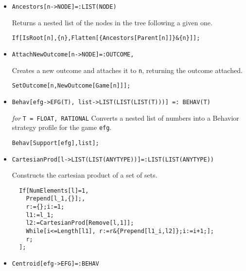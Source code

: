 \begin{itemize}
\item{}
\protect \large \begin{verbatim}
Ancestors[n->NODE]=:LIST(NODE)
\end{verbatim}\normalsize

\bd 
Returns a nested list of the nodes in the tree following a given one.  
\begin{verbatim}
If[IsRoot[n],{n},Flatten[{Ancestors[Parent[n]]}&{n}]];
\end{verbatim} 
\ed


\item{}
\protect \large \begin{verbatim}
AttachNewOutcome[n->NODE]=:OUTCOME,
\end{verbatim}\normalsize

\bd 
Creates a new outcome and attaches it to \verb+n+, returning the
outcome attached.  
\begin{verbatim}
SetOutcome[n,NewOutcome[Game[n]]];
\end{verbatim} 
\ed


\item{}
\protect \large \begin{verbatim}
Behav[efg->EFG(T), list->LIST(LIST(LIST(T)))] =: BEHAV(T)
\end{verbatim}\normalsize

{\it for} {\tt T = FLOAT, RATIONAL}
\bd 
Converts a nested list of numbers into a Behavior strategy
profile for the game \verb+efg+.
\begin{verbatim}
Behav[Support[efg],list];
\end{verbatim} 
\ed

\item{}
\protect \large \begin{verbatim}
CartesianProd[l->LIST(LIST(ANYTYPE))]=:LIST(LIST(ANYTYPE))
\end{verbatim}\normalsize

\bd 
Constructs the cartesian product of a set of sets.  
\begin{verbatim}
  If[NumElements[l]=1,
    Prepend[l_1,{}];,
    r:={};i:=1;
    l1:=l_1;
    l2:=CartesianProd[Remove[l,1]];
    While[i<=Length[l1], r:=r&{Prepend[l1_i,l2]};i:=i+1;];
    r;
  ];
\end{verbatim} 
\ed
	

\item{}
\protect \large \begin{verbatim}
Centroid[efg->EFG]=:BEHAV
\end{verbatim}\normalsize


\end{itemize}

